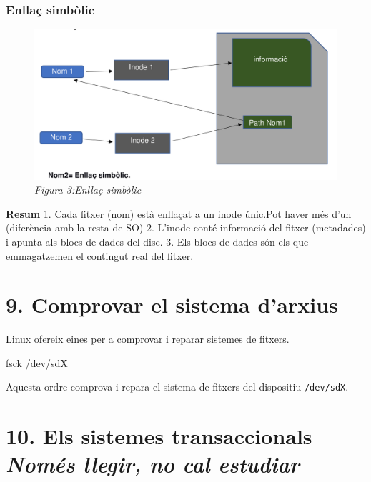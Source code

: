 \documentclass[
  12 pt,
  a4paper,
]{article}
\newenvironment{Shaded}{\begin{snugshade}}{\end{snugshade}}
\newcommand{\ExtensionTok}[1]{#1}
\newcommand{\NormalTok}[1]{#1}
\begin{document}
\subsubsection{Enllaç simbòlic}\label{enllauxe7-simbuxf2lic}

\begin{figure}
\centering
\includegraphics{png/enllaçSimbòlic.png}
\caption{\emph{Figura 3:Enllaç simbòlic}}
\end{figure}

\textbf{Resum} 1. Cada fitxer (nom) està enllaçat a un inode únic.Pot
haver més d'un (diferència amb la resta de SO) 2. L'inode conté
informació del fitxer (metadades) i apunta als blocs de dades del disc.
3. Els blocs de dades són els que emmagatzemen el contingut real del
fitxer.

\section{9. Comprovar el sistema
d'arxius}\label{comprovar-el-sistema-darxius}

Linux ofereix eines per a comprovar i reparar sistemes de fitxers.

\begin{Shaded}
\begin{Highlighting}[]
\ExtensionTok{fsck}\NormalTok{ /dev/sdX}
\end{Highlighting}
\end{Shaded}

Aquesta ordre comprova i repara el sistema de fitxers del dispositiu
\texttt{/dev/sdX}.

\section{\texorpdfstring{10. Els sistemes transaccionals \emph{Només
llegir, no cal
estudiar}}{10. Els sistemes transaccionals Només llegir, no cal estudiar}}\label{els-sistemes-transaccionals-nomuxe9s-llegir-no-cal-estudiar}
\end{document}
